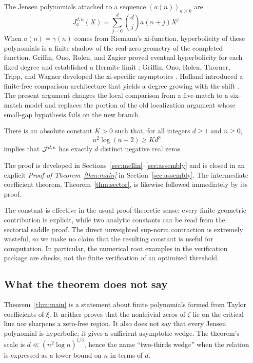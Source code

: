 \documentclass[12pt]{article}
\begin{document}
The Jensen polynomials attached to a sequence $(a(n))_{n\ge0}$ are
\[
  J_a^{d,n}(X)=\sum_{j=0}^{d}\binom dj a(n+j)X^j.
\]
When $a(n)=\gamma(n)$ comes from Riemann's xi-function, hyperbolicity of
these polynomials is a finite shadow of the real-zero geometry of the
completed function.  Griffin, Ono, Rolen, and Zagier proved eventual
hyperbolicity for each fixed degree and established a Hermite limit
\cite{GORZ2019}; Griffin, Ono, Rolen, Thorner, Tripp, and Wagner developed
the xi-specific asymptotics \cite{GORTTW2020}.  Holland introduced a
finite-free comparison architecture that yields a degree growing with the
shift \cite{Holland2026}.  The present argument changes the local comparison
from a five-match to a six-match model and replaces the portion of the old
localization argument whose small-gap hypothesis fails on the new branch.

\begin{theorem}\label{thm:main}
There is an absolute constant $K>0$ such that, for all integers $d\ge1$ and
$n\ge0$,
\begin{equation}\label{eq:wedge}
       n^2\log(n+2)\ge Kd^3
\end{equation}
implies that $\mathcal J^{d,n}$ has exactly $d$ distinct negative real zeros.
\end{theorem}

The proof is developed in Sections~\ref{sec:mellin}--\ref{sec:assembly} and
is closed in an explicit \emph{Proof of Theorem~\ref{thm:main}} in
Section~\ref{sec:assembly}.  The intermediate coefficient theorem,
Theorem~\ref{thm:sector}, is likewise followed immediately by its proof.

The constant is effective in the usual proof-theoretic sense: every finite
geometric contribution is explicit, while two analytic constants can be
read from the sectorial saddle proof.  The direct unweighted sup-norm
contraction is extremely wasteful, so we make no claim that the resulting
constant is useful for computation.  In particular, the numerical root
examples in the verification package are checks, not the finite verification
of an optimized threshold.

\subsection{What the theorem does not say}

Theorem~\ref{thm:main} is a statement about finite polynomials formed from
Taylor coefficients of $\xi$.  It neither proves that the nontrivial zeros
of $\zeta$ lie on the critical line nor sharpens a zero-free region.  It also
does not say that every Jensen polynomial is hyperbolic; it gives a
sufficient asymptotic wedge.  The theorem's scale is
$d\ll(n^2\log n)^{1/3}$, hence the name ``two-thirds wedge'' when the
relation is expressed as a lower bound on $n$ in terms of $d$.
\end{document}
